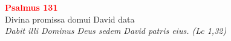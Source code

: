 


\def\greinitialformat#1{%
{\fontsize{39}{39}\selectfont #1}%
}




\vspace{0.3cm}
\begin{center}
 \textcolor{red}{\large \bf Psalmus 131}\\
Divina promissa domui David data\\
\textit{\small Dabit illi Dominus Deus sedem David patris eius. (Lc 1,32)}
\end{center}
